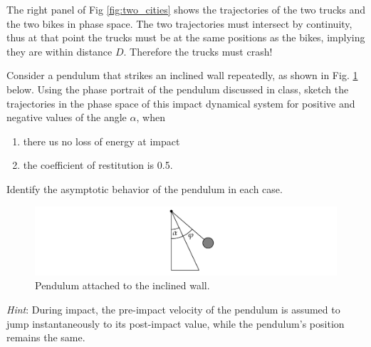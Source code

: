 \begin{ex}
	The right panel of Fig \ref{fig:two_cities} shows the trajectories of the two trucks and the two bikes in phase space. The two trajectories must intersect by continuity, thus at that point the trucks must be at the same positions as the bikes, implying they are within distance $D$. Therefore the trucks must crash!	
\end{ex}

\begin{exercise}
Consider a pendulum that strikes an inclined wall repeatedly, as shown in Fig. \ref{Q01D01} below. Using the phase portrait of the pendulum discussed in class, sketch the trajectories in the phase space of this impact dynamical system for positive and negative values of the angle $\alpha$, when

\begin{enumerate}
	\item there us no loss of energy at impact
	\item the coefficient of restitution is 0.5.
\end{enumerate}
Identify the asymptotic behavior of the pendulum in each case.

\begin{figure}[h]
	\centering
	\includegraphics[scale=0.9]{figures/intro/Series/Q01D01.pdf}
	\caption{Pendulum attached to the inclined wall.}
	\label{Q01D01}
\end{figure}

\textit{Hint}: During impact, the pre-impact velocity of the pendulum is assumed to jump instantaneously to its post-impact value, while the pendulum's position remains the same.
\end{exercise}

